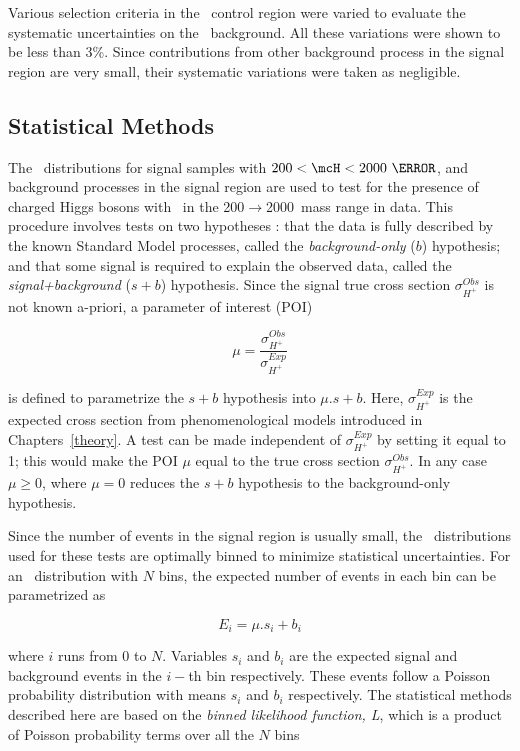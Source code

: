 \par Various selection criteria in the \Wjets\ control region were varied to evaluate the 
systematic uncertainties on the \Wjets\ background. All these variations were shown to be 
less than 3\%. Since contributions from other background process in the signal region are 
very small, their systematic variations were taken as negligible. 

\subsection{Statistical Methods}
\par The \mT\ distributions for signal samples with $200<\mcH<2000~\GeV$, and background processes
 in the signal region are used to test for the presence of charged Higgs bosons with \mcH\ in the 200$\to$2000~\GeV mass range 
in data. This procedure involves tests on two hypotheses : that the data is fully 
described by the known Standard Model processes, called the {\it background-only} ($b$) hypothesis; and that some 
signal is required to explain the observed data, called the {\it signal+background} ($s+b$) hypothesis. 
Since the signal true cross section $\sigma_{H^+}^{Obs}$ is not known a-priori, a parameter of interest (POI)  

\begin{equation}
\mu = \frac{\sigma_{H^+}^{Obs}}{\sigma^{Exp}_{H^+}}
\end{equation}

is defined to parametrize the $s+b$ hypothesis into $\mu.s+b$. Here, $\sigma^{Exp}_{H^+}$ is the 
expected cross section from phenomenological models introduced in Chapters~\ref{theory}. A test can be made independent of 
$\sigma^{Exp}_{H^+}$ by setting it equal to 1; this would make the POI $\mu$ equal to the true 
cross section $\sigma_{H^+}^{Obs}$. In any case $\mu\geq 0$, where $\mu=0$ reduces the $s+b$ hypothesis to the 
background-only hypothesis. 

\par Since the number of events in the signal region is usually small, the \mT\ distributions used  for these 
tests are optimally binned to minimize statistical uncertainties. For an \mT\ distribution with $N$ bins, 
the expected number of events in each bin can be parametrized as   

\begin{equation}
E_i = \mu.s_i + b_i
\end{equation} 

where $i$ runs from 0 to $N$. Variables $s_i$ and $b_i$ are the expected signal 
and background events in the $i-$th bin respectively. These events follow a Poisson probability distribution 
with means $s_i$ and $b_i$ respectively. The statistical methods described here are based on the {\it binned likelihood 
function, L}, which is a product of Poisson probability terms over all the $N$ bins    


